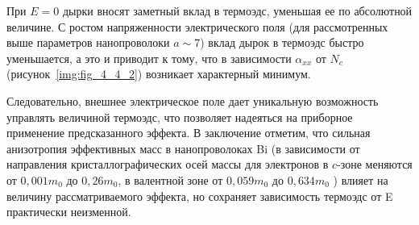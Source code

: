 При $E=0$ дырки вносят заметный вклад в термоэдс, уменьшая ее по абсолютной величине. С ростом напряженности электрического поля (для рассмотренных выше параметров нанопроволоки $a\sim 7$) вклад дырок в термоэдс быстро уменьшается, а это и приводит к тому, что в зависимости $\alpha_{xx} $ от $N_c $ (рисунок~\ref{img:fig_4_4_2}) возникает характерный минимум.
 
Следовательно, внешнее электрическое поле дает уникальную возможность управлять величиной термоэдс, что позволяет надеяться  на приборное применение предсказанного эффекта. В заключение отметим, что сильная анизотропия эффективных масс в нанопроволоках Bi (в зависимости от направления кристаллографических осей массы для электронов в $c$-зоне меняются от $0,001 m_0 $ до $0,26 m_0 $, в валентной зоне от $0,059m_{0} $ до $0,634m_{0} $ \cite{Levin2009a}) влияет на величину рассматриваемого эффекта, но сохраняет зависимость термоэдс от E практически неизменной.
